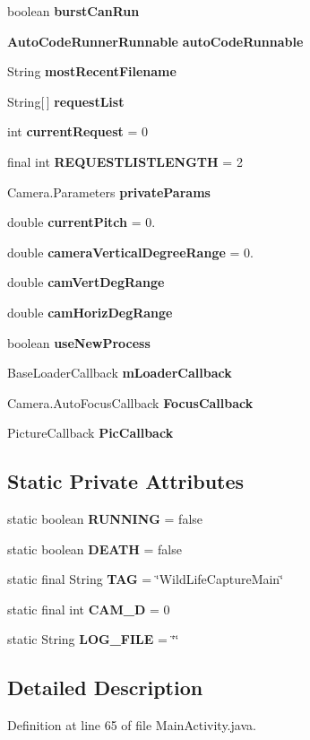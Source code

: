 \begin{DoxyCompactItemize}
boolean {\bf burst\+Can\+Run}
\item 
{\bf Auto\+Code\+Runner\+Runnable} {\bf auto\+Code\+Runnable}
\item 
String {\bf most\+Recent\+Filename}
\item 
String[$\,$] {\bf request\+List}
\item 
int {\bf current\+Request} = 0
\item 
final int {\bf R\+E\+Q\+U\+E\+S\+T\+L\+I\+S\+T\+L\+E\+N\+G\+T\+H} = 2
\item 
Camera.\+Parameters {\bf private\+Params}
\item 
double {\bf current\+Pitch} = 0.
\item 
double {\bf camera\+Vertical\+Degree\+Range} = 0.
\item 
double {\bf cam\+Vert\+Deg\+Range}
\item 
double {\bf cam\+Horiz\+Deg\+Range}
\item 
boolean {\bf use\+New\+Process}
\item 
Base\+Loader\+Callback {\bf m\+Loader\+Callback}
\item 
Camera.\+Auto\+Focus\+Callback {\bf Focus\+Callback}
\item 
Picture\+Callback {\bf Pic\+Callback}
\end{DoxyCompactItemize}
\subsection*{Static Private Attributes}
\begin{DoxyCompactItemize}
\item 
static boolean {\bf R\+U\+N\+N\+I\+N\+G} = false
\item 
static boolean {\bf D\+E\+A\+T\+H} = false
\item 
static final String {\bf T\+A\+G} = \char`\"{}Wild\+Life\+Capture\+Main\char`\"{}
\item 
static final int {\bf C\+A\+M\+\_\+D} = 0
\item 
static String {\bf L\+O\+G\+\_\+\+F\+I\+L\+E} = \char`\"{}\char`\"{}
\end{DoxyCompactItemize}


\subsection{Detailed Description}


Definition at line 65 of file Main\+Activity.\+java.



